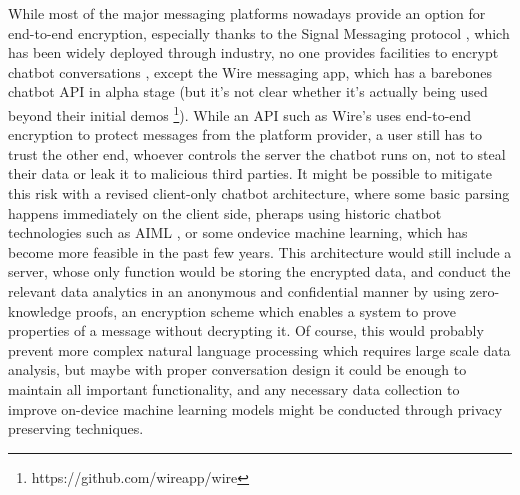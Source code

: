 While most of the major messaging platforms nowadays provide an option for end-to-end encryption, especially thanks to the Signal Messaging protocol \cite{signal}, which has been widely deployed through industry, no one provides facilities to encrypt chatbot conversations \cite{Alesanco2018}, except the Wire messaging app, which has a barebones chatbot API in alpha stage (but it's not clear whether it's actually being used beyond their initial demos \footnote{https://github.com/wireapp/wire}). While an API such as Wire's uses end-to-end encryption to protect messages from the platform provider, a user still has to trust the other end, whoever controls the server the chatbot runs on, not to steal their data or leak it to malicious third parties. It might be possible to mitigate this risk with a revised client-only chatbot architecture, where some basic parsing happens immediately on the client side, pheraps using historic chatbot technologies such as AIML \cite{aiml}, or some ondevice machine learning, which has become more feasible in the past few years. This architecture would still include a server, whose only function would be storing the encrypted data, and conduct the relevant data analytics in an anonymous and confidential manner by using zero-knowledge proofs, an encryption scheme which enables a system to prove properties of a message without decrypting it. Of course, this would probably prevent more complex natural language processing which requires large scale data analysis, but maybe with proper conversation design it could be enough to maintain all important functionality, and any necessary data collection to improve on-device machine learning models might be conducted through privacy preserving techniques.
